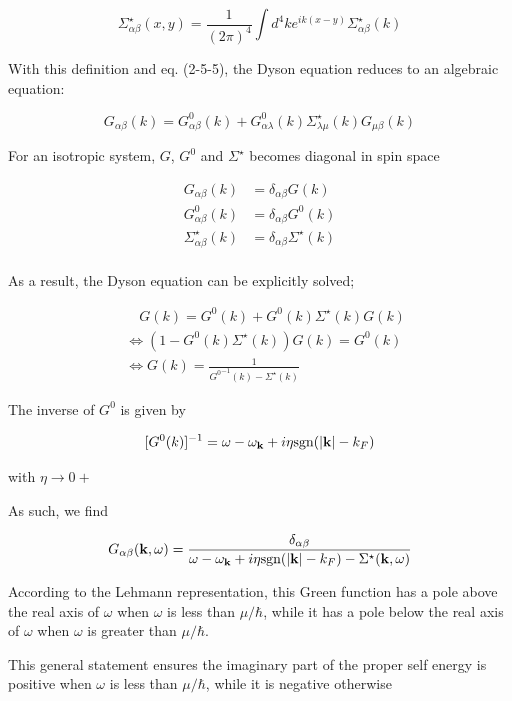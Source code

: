 \[
\Sigma_{\alpha\beta}^{\star}(x,y) = \frac{1}{(2\pi)^4}\int d^4 k e^{ik(x-y)}\Sigma_{\alpha\beta}^{\star}(k)\]

With this definition and eq. (2-5-5), the Dyson equation reduces to an algebraic equation: 

\[G_{\alpha\beta}(k) = G^0_{\alpha\beta}(k) + G_{\alpha\lambda}^0(k)\Sigma_{\lambda\mu}^{\star}(k)G_{\mu\beta}(k) \]

For an isotropic system, $G$, $G^0$ and $\Sigma^\star$ becomes diagonal in spin space

\[\begin{split}
G_{\alpha\beta}(k) &= \delta_{\alpha\beta}G(k)\\
G^0_{\alpha\beta}(k) &= \delta_{\alpha\beta}G^0(k)\\
\Sigma^\star_{\alpha\beta}(k) &= \delta_{\alpha\beta}\Sigma^\star(k)\\
\end{split}\]

As a result, the Dyson equation can be explicitly solved;

\[\begin{split}
&\quad G(k) = G^0(k) + G^0(k)\Sigma^\star(k)G(k)\\
&\Longleftrightarrow (1-G^0(k)\Sigma^\star(k))G(k)=G^0(k)\\
&\Longleftrightarrow G(k) = \frac{1}{{G^0}^{-1}(k)-\Sigma^\star(k)}
\end{split} \]

The inverse of $G^0$ is given by

\[[G^0(k)]^{-1} = \omega - \omega_{\bf k}+i\eta \text{sgn}(|{\bf k}|-k_F) \]

with $\eta\to 0+$

As such, we find

\[G_{\alpha\beta}({\bf k},\omega) = \frac{\delta_{\alpha\beta}}{\omega-\omega_{\bf k}+i\eta\text{sgn}(|{\bf k}|-k_F)-\Sigma^\star({\bf k},\omega)} \]

According to the Lehmann representation, this Green function has a pole above the real axis of $\omega$ when $\omega$ is less than $\mu/\hbar$, while it has a pole below the real axis of $\omega$ when $\omega$ is greater than $\mu/\hbar$. 

This general statement ensures the imaginary part of the proper self energy is positive when $\omega$ is less than $\mu/\hbar$, while it is negative otherwise

